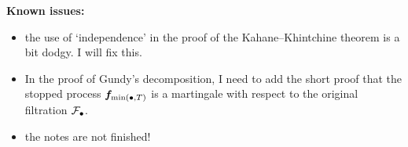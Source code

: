 \textbf{Known issues:}
\begin{itemize}
\item the use of `independence' in the proof of the Kahane--Khintchine theorem is a bit dodgy. I will fix this.
\item In the proof of Gundy's decomposition, I need to add the short proof that the stopped process $\bm{f}_{\min(\bullet, T)}$ is a martingale with respect to the original filtration $\mathcal{F}_{\bullet}$.
\item the notes are not finished!
\end{itemize}

  





